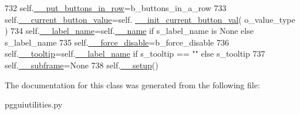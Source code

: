 \begin{DoxyCode}
732         self.\hyperlink{classnegui_1_1pgguiutilities_1_1KeyCategoricalValueFrame_a869087c9cc908de0226eec78cb4282bb}{\_\_put\_buttons\_in\_row}=b\_buttons\_in\_a\_row
733         self.\hyperlink{classnegui_1_1pgguiutilities_1_1KeyCategoricalValueFrame_aa1bb987386f2e559c6de976b745f185e}{\_\_current\_button\_value}=self.
      \hyperlink{classnegui_1_1pgguiutilities_1_1KeyCategoricalValueFrame_ab1e309b3e63c5c4a57d37d2a61f4e90d}{\_\_init\_current\_button\_val}( o\_value\_type )
734         self.\hyperlink{classnegui_1_1pgguiutilities_1_1KeyCategoricalValueFrame_a3a453ac47871c2f8b894442fd3ef5d07}{\_\_label\_name}=self.\hyperlink{classnegui_1_1pgguiutilities_1_1KeyCategoricalValueFrame_a92a1947d6110ada3bd813cc8e84d84ad}{\_\_name} \textcolor{keywordflow}{if} s\_label\_name \textcolor{keywordflow}{is} \textcolor{keywordtype}{None} \textcolor{keywordflow}{else} s\_label\_name
735         self.\hyperlink{classnegui_1_1pgguiutilities_1_1KeyCategoricalValueFrame_a01ea2795b9136b4fab5d6fe78dc2947d}{\_\_force\_disable}=b\_force\_disable
736         self.\hyperlink{classnegui_1_1pgguiutilities_1_1KeyCategoricalValueFrame_ae2f1424ab33f1ff0c9477dcf401748ca}{\_\_tooltip}=self.\hyperlink{classnegui_1_1pgguiutilities_1_1KeyCategoricalValueFrame_a3a453ac47871c2f8b894442fd3ef5d07}{\_\_label\_name} \textcolor{keywordflow}{if} s\_tooltip == \textcolor{stringliteral}{""} \textcolor{keywordflow}{else} s\_tooltip
737         self.\hyperlink{classnegui_1_1pgguiutilities_1_1KeyCategoricalValueFrame_ad2350dd7438d98d077c86e8295425ca0}{\_\_subframe}=\textcolor{keywordtype}{None}
738         self.\hyperlink{classnegui_1_1pgguiutilities_1_1KeyCategoricalValueFrame_a1e890256208ab06e21db468c7aed6bd8}{\_\_setup}()
\end{DoxyCode}


The documentation for this class was generated from the following file\+:\begin{DoxyCompactItemize}
\item 
pgguiutilities.\+py\end{DoxyCompactItemize}
